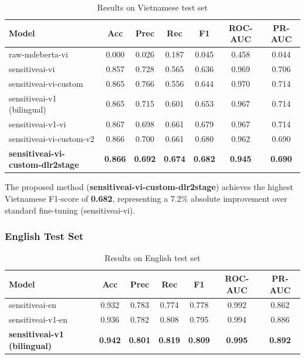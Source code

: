 \documentclass[12pt,a4paper]{article}
\begin{document}
\begin{table}[htbp]
    \centering
    \caption{Results on Vietnamese test set}
    \label{tab:results_vi}
    \begin{tabular}{@{}lcccccc@{}}
        \toprule
        \textbf{Model} & \textbf{Acc} & \textbf{Prec} & \textbf{Rec} & \textbf{F1} & \textbf{ROC-AUC} & \textbf{PR-AUC} \\
        \midrule
        raw-mdeberta-vi        & 0.000 & 0.026 & 0.187 & 0.045 & 0.458 & 0.044 \\
        sensitiveai-vi         & 0.857 & 0.728 & 0.565 & 0.636 & 0.969 & 0.706 \\
        sensitiveai-vi-custom  & 0.865 & 0.766 & 0.556 & 0.644 & 0.970 & 0.714 \\
        sensitiveai-v1 (bilingual) & 0.865 & 0.715 & 0.601 & 0.653 & 0.967 & 0.714 \\
        sensitiveai-v1-vi      & 0.867 & 0.698 & 0.661 & 0.679 & 0.967 & 0.714 \\
        sensitiveai-vi-custom-v2 & 0.866 & 0.700 & 0.661 & 0.680 & 0.962 & 0.690 \\
        \textbf{sensitiveai-vi-custom-dlr2stage} & \textbf{0.866} & \textbf{0.692} & \textbf{0.674} & \textbf{0.682} & \textbf{0.945} & \textbf{0.690} \\
        \bottomrule
    \end{tabular}
\end{table}

The proposed method (\textbf{sensitiveai-vi-custom-dlr2stage}) achieves the highest Vietnamese F1-score of \textbf{0.682}, representing a 7.2\% absolute improvement over standard fine-tuning (sensitiveai-vi).

\subsubsection{English Test Set}

\begin{table}[htbp]
    \centering
    \caption{Results on English test set}
    \label{tab:results_en}
    \begin{tabular}{@{}lcccccc@{}}
        \toprule
        \textbf{Model} & \textbf{Acc} & \textbf{Prec} & \textbf{Rec} & \textbf{F1} & \textbf{ROC-AUC} & \textbf{PR-AUC} \\
        \midrule
        sensitiveai-en     & 0.932 & 0.783 & 0.774 & 0.778 & 0.992 & 0.862 \\
        sensitiveai-v1-en  & 0.936 & 0.782 & 0.808 & 0.795 & 0.994 & 0.886 \\
        \textbf{sensitiveai-v1 (bilingual)} & \textbf{0.942} & \textbf{0.801} & \textbf{0.819} & \textbf{0.809} & \textbf{0.995} & \textbf{0.892} \\
        \bottomrule
    \end{tabular}
\end{table}
\end{document}
